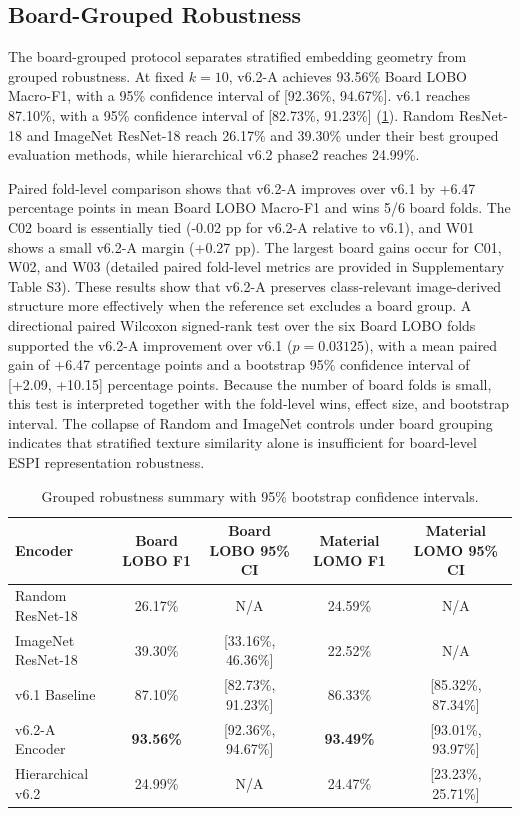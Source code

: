 \documentclass[review,3p,times]{elsarticle}
\begin{document}
\subsection{Board-Grouped Robustness}
The board-grouped protocol separates stratified embedding geometry from grouped robustness. At fixed $k=10$, v6.2-A achieves 93.56\% Board LOBO Macro-F1, with a 95\% confidence interval of [92.36\%, 94.67\%]. v6.1 reaches 87.10\%, with a 95\% confidence interval of [82.73\%, 91.23\%] (\cref{tab:table2}). Random ResNet-18 and ImageNet ResNet-18 reach 26.17\% and 39.30\% under their best grouped evaluation methods, while hierarchical v6.2 phase2 reaches 24.99\%.

Paired fold-level comparison shows that v6.2-A improves over v6.1 by +6.47 percentage points in mean Board LOBO Macro-F1 and wins 5/6 board folds. The C02 board is essentially tied (-0.02 pp for v6.2-A relative to v6.1), and W01 shows a small v6.2-A margin (+0.27 pp). The largest board gains occur for C01, W02, and W03 (detailed paired fold-level metrics are provided in Supplementary Table S3).
These results show that v6.2-A preserves class-relevant image-derived structure more effectively when the reference set excludes a board group. A directional paired Wilcoxon signed-rank test over the six Board LOBO folds supported the v6.2-A improvement over v6.1 ($p=0.03125$), with a mean paired gain of +6.47 percentage points and a bootstrap 95\% confidence interval of [+2.09, +10.15] percentage points. Because the number of board folds is small, this test is interpreted together with the fold-level wins, effect size, and bootstrap interval. The collapse of Random and ImageNet controls under board grouping indicates that stratified texture similarity alone is insufficient for board-level ESPI representation robustness.

\begin{table}[htbp]
\centering
\caption{Grouped robustness summary with 95\% bootstrap confidence intervals.}
\label{tab:table2}
\begin{tabular}{lcccc}
\toprule
\textbf{Encoder} & \textbf{Board LOBO F1} & \textbf{Board LOBO 95\% CI} & \textbf{Material LOMO F1} & \textbf{Material LOMO 95\% CI} \\
\midrule
Random ResNet-18 & 26.17\% & N/A & 24.59\% & N/A \\
ImageNet ResNet-18 & 39.30\% & [33.16\%, 46.36\%] & 22.52\% & N/A \\
v6.1 Baseline & 87.10\% & [82.73\%, 91.23\%] & 86.33\% & [85.32\%, 87.34\%] \\
v6.2-A Encoder & \textbf{93.56\%} & [92.36\%, 94.67\%] & \textbf{93.49\%} & [93.01\%, 93.97\%] \\
Hierarchical v6.2 & 24.99\% & N/A & 24.47\% & [23.23\%, 25.71\%] \\
\bottomrule
\end{tabular}
\end{table}
\end{document}
